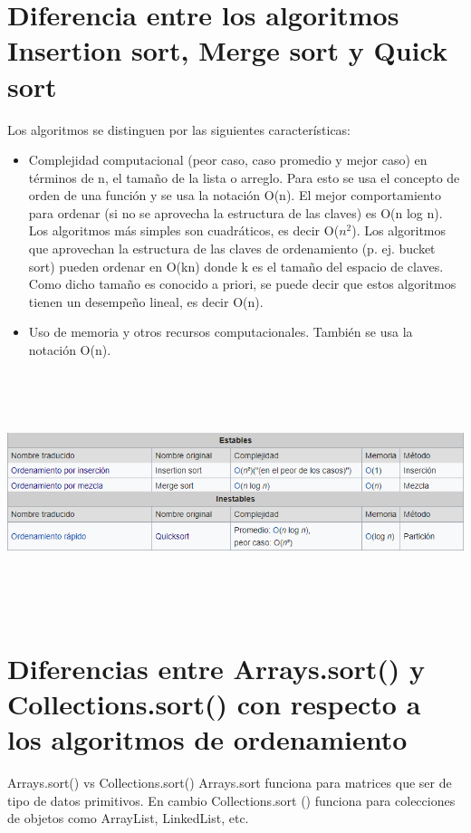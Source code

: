 \documentclass[12pt,letterpaper]{article}
\begin{document}
\section{Diferencia entre los algoritmos Insertion sort, Merge sort y Quick sort}
\vskip 0.4cm
Los algoritmos se distinguen por las siguientes características:
\vskip 0.4cm
\begin{itemize}
\item Complejidad computacional (peor caso, caso promedio y mejor caso) en términos de n, el tamaño de la lista o arreglo. Para esto se usa el concepto de orden de una función y se usa la notación O(n). El mejor comportamiento para ordenar (si no se aprovecha la estructura de las claves) es O(n log n). Los algoritmos más simples son cuadráticos, es decir O($n^2$). Los algoritmos que aprovechan la estructura de las claves de ordenamiento (p. ej. bucket sort) pueden ordenar en O(kn) donde k es el tamaño del espacio de claves. Como dicho tamaño es conocido a priori, se puede decir que estos algoritmos tienen un desempeño lineal, es decir O(n).
\item Uso de memoria y otros recursos computacionales. También se usa la notación O(n).
\end{itemize}
\vskip 0.2cm

\includegraphics[width=17cm,height=7cm]{Imagen9}

\vskip 0.4cm
\newpage
\section{Diferencias entre Arrays.sort() y Collections.sort() con respecto a los algoritmos de ordenamiento}
\vskip 0.4cm
Arrays.sort() vs Collections.sort()
\vskip 0.4cm
Arrays.sort funciona para matrices que ser de tipo de datos primitivos. En cambio Collections.sort () funciona para colecciones de objetos como ArrayList, LinkedList, etc.
\end{document}

